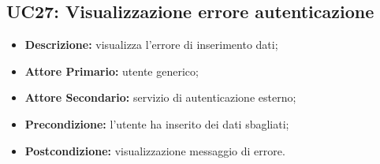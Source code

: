 \subsection{UC27: Visualizzazione errore autenticazione }
\label{sec:UC27}
\begin{itemize}
    \item \textbf{Descrizione:} visualizza l'errore di inserimento dati;
    \item \textbf{Attore Primario:} utente generico;
    \item \textbf{Attore Secondario:} servizio di autenticazione esterno;
    \item \textbf{Precondizione:} l'utente ha inserito dei dati sbagliati;
    \item \textbf{Postcondizione:} visualizzazione messaggio di errore.
\end{itemize}
